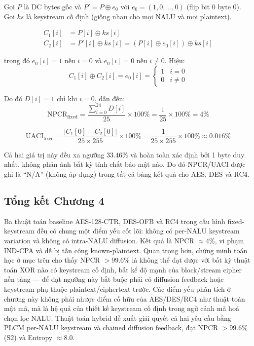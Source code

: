 Gọi $P$ là DC bytes gốc và $P' = P \oplus e_0$ với $e_0 = (1, 0, \ldots, 0)$ (flip bit 0 byte 0). Gọi $ks$ là keystream cố định (giống nhau cho mọi NALU và mọi plaintext).

\begin{align}
C_1[i] &= P[i] \oplus ks[i] \label{eq:c1} \\
C_2[i] &= P'[i] \oplus ks[i] = (P[i] \oplus e_0[i]) \oplus ks[i] \label{eq:c2}
\end{align}

trong đó $e_0[i] = 1$ nếu $i = 0$ và $e_0[i] = 0$ nếu $i \neq 0$. Hiệu:
\begin{equation}
C_1[i] \oplus C_2[i] = e_0[i] = \begin{cases} 1 & i = 0 \\ 0 & i \neq 0 \end{cases}
\end{equation}

Do đó $D[i] = 1$ chỉ khi $i = 0$, dẫn đến:
\begin{equation}
\text{NPCR}_{\text{fixed}} = \frac{\sum_{i=0}^{24} D[i]}{25} \times 100\%
= \frac{1}{25} \times 100\% = 4\%
\end{equation}

\begin{equation}
\text{UACI}_{\text{fixed}} = \frac{|C_1[0] - C_2[0]|}{25 \times 255} \times 100\%
= \frac{1}{25 \times 255} \times 100\% \approx 0.016\%
\end{equation}

Cả hai giá trị này đều xa ngưỡng $33.46\%$ và hoàn toàn xác định bởi 1 byte duy nhất, không phản ánh bất kỳ tính chất bảo mật nào. Do đó NPCR/UACI được ghi là ``N/A'' (không áp dụng) trong tất cả bảng kết quả cho AES, DES và RC4.

\subsection{Tổng kết Chương 4}

Ba thuật toán baseline AES-128-CTR, DES-OFB và RC4 trong cấu hình fixed-keystream đều có chung một điểm yếu cốt lõi: không có per-NALU keystream variation và không có intra-NALU diffusion. Kết quả là NPCR $\approx 4\%$, vi phạm IND-CPA và dễ bị tấn công known-plaintext. Quan trọng hơn, chứng minh toán học ở mục trên cho thấy NPCR $> 99.6\%$ là không thể đạt được với bất kỳ thuật toán XOR nào có keystream cố định, bất kể độ mạnh của block/stream cipher nền tảng --- để đạt ngưỡng này bắt buộc phải có diffusion feedback hoặc keystream phụ thuộc plaintext/ciphertext trước. Các điểm yếu phân tích ở chương này không phải nhược điểm cố hữu của AES/DES/RC4 như thuật toán mật mã, mà là hệ quả của thiết kế keystream cố định trong ngữ cảnh mã hoá chọn lọc NALU. Thuật toán hybrid đề xuất giải quyết cả hai yêu cầu bằng PLCM per-NALU keystream và chained diffusion feedback, đạt NPCR $> 99.6\%$ (S2) và Entropy $\approx 8.0$.
